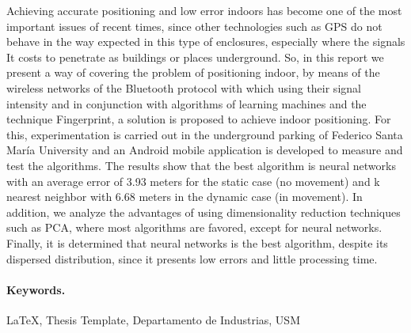 
Achieving accurate positioning and low error indoors has become one of the most important issues of recent times, since other technologies such as GPS do not behave in the way expected in this type of enclosures, especially where the signals It costs to penetrate as buildings or places underground. So, in this report we present a way of covering the problem of positioning indoor, by means of the wireless networks of the Bluetooth protocol with which using their signal intensity and in conjunction with algorithms of learning machines and the technique Fingerprint, a solution is proposed to achieve indoor positioning. For this, experimentation is carried out in the underground parking of Federico Santa María University and an Android mobile application is developed to measure and test the algorithms. The results show that the best algorithm is neural networks with an average error of 3.93 meters for the static case (no movement) and k nearest neighbor with 6.68 meters in the dynamic case (in movement). In addition, we analyze the advantages of using dimensionality reduction techniques such as PCA, where most algorithms are favored, except for neural networks. Finally, it is determined that neural networks is the best algorithm, despite its dispersed distribution, since it presents low errors and little processing time.

\vspace{20mm}

\paragraph{Keywords.}
\LaTeX{}, Thesis Template, Departamento de Industrias, USM

\vspace{20mm}